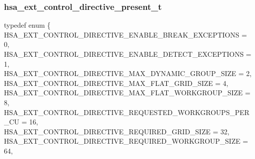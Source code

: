 \documentclass[final]{book}
\newcommand{\reftyp}[1]{#1}
\newcommand{\refenu}[1]{\reftyp{#1}}
\newenvironment{mylongtable}{\rowcolors{0}{lightgray}{lightgray}\longtable} {
\endlongtable}
\begin{document}
\subsubsection{hsa_\-ext_\-control_\-directive_\-present_\-t}
\vspace{-5.5mm}\begin{mylongtable}{@{}p{\textwidth}}
\rule{0pt}{3ex}typedef enum \{\\\hspace{1.7em}\hypertarget{group__ext-finalizer_1gga143d9e622dfd7889d52fb5eb5ed1ffdba1c209f3a9fd22b358006c221303f8893}{\refenu{HSA_\-EXT_\-CONTROL_\-DIRECTIVE_\-ENABLE_\-BREAK_\-EXCEPTIONS}} = 0,\\
\hspace{1.7em}\hypertarget{group__ext-finalizer_1gga143d9e622dfd7889d52fb5eb5ed1ffdba5f6e061c9abd08976ee6f4c4ee48f30a}{\refenu{HSA_\-EXT_\-CONTROL_\-DIRECTIVE_\-ENABLE_\-DETECT_\-EXCEPTIONS}} = 1,\\
\hspace{1.7em}\hypertarget{group__ext-finalizer_1gga143d9e622dfd7889d52fb5eb5ed1ffdba7787b99c887699ca6fe8d1cd4de3477e}{\refenu{HSA_\-EXT_\-CONTROL_\-DIRECTIVE_\-MAX_\-DYNAMIC_\-GROUP_\-SIZE}} = 2,\\
\hspace{1.7em}\hypertarget{group__ext-finalizer_1gga143d9e622dfd7889d52fb5eb5ed1ffdba8f84c9f5303be293df76bf82b002299c}{\refenu{HSA_\-EXT_\-CONTROL_\-DIRECTIVE_\-MAX_\-FLAT_\-GRID_\-SIZE}} = 4,\\
\hspace{1.7em}\hypertarget{group__ext-finalizer_1gga143d9e622dfd7889d52fb5eb5ed1ffdbaa0e6d7d860284c6cadde5c7e9db66968}{\refenu{HSA_\-EXT_\-CONTROL_\-DIRECTIVE_\-MAX_\-FLAT_\-WORKGROUP_\-SIZE}} = 8,\\
\hspace{1.7em}\hypertarget{group__ext-finalizer_1gga143d9e622dfd7889d52fb5eb5ed1ffdbae6659470b66232e7ec4a749a032dc95d}{\refenu{HSA_\-EXT_\-CONTROL_\-DIRECTIVE_\-REQUESTED_\-WORKGROUPS_\-PER_\-CU}} = 16,\\
\hspace{1.7em}\hypertarget{group__ext-finalizer_1gga143d9e622dfd7889d52fb5eb5ed1ffdbaa9878485a06df4090cba80c85acb32be}{\refenu{HSA_\-EXT_\-CONTROL_\-DIRECTIVE_\-REQUIRED_\-GRID_\-SIZE}} = 32,\\
\hspace{1.7em}\hypertarget{group__ext-finalizer_1gga143d9e622dfd7889d52fb5eb5ed1ffdbab26301028f39a1ac099aae9e74251438}{\refenu{HSA_\-EXT_\-CONTROL_\-DIRECTIVE_\-REQUIRED_\-WORKGROUP_\-SIZE}} = 64,\\

\end{mylongtable}
\end{document}
